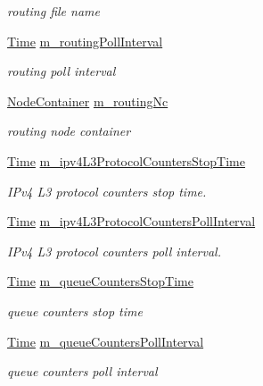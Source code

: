 \begin{DoxyCompactItemize}
\begin{DoxyCompactList}\small\item\em routing file name \end{DoxyCompactList}\item 
\hyperlink{classns3_1_1Time}{Time} \hyperlink{classns3_1_1AnimationInterface_a16bea9b8d92eaa954ea0fc7d067d4ffd}{m\+\_\+routing\+Poll\+Interval}
\begin{DoxyCompactList}\small\item\em routing poll interval \end{DoxyCompactList}\item 
\hyperlink{classns3_1_1NodeContainer}{Node\+Container} \hyperlink{classns3_1_1AnimationInterface_af739aca09318747e578cf97d59efe154}{m\+\_\+routing\+Nc}
\begin{DoxyCompactList}\small\item\em routing node container \end{DoxyCompactList}\item 
\hyperlink{classns3_1_1Time}{Time} \hyperlink{classns3_1_1AnimationInterface_a7927b06bf57543f55408aa0828b9010a}{m\+\_\+ipv4\+L3\+Protocol\+Counters\+Stop\+Time}
\begin{DoxyCompactList}\small\item\em I\+Pv4 L3 protocol counters stop time. \end{DoxyCompactList}\item 
\hyperlink{classns3_1_1Time}{Time} \hyperlink{classns3_1_1AnimationInterface_a7a53cc3f3e1835d7426ed14f3c5c66c5}{m\+\_\+ipv4\+L3\+Protocol\+Counters\+Poll\+Interval}
\begin{DoxyCompactList}\small\item\em I\+Pv4 L3 protocol counters poll interval. \end{DoxyCompactList}\item 
\hyperlink{classns3_1_1Time}{Time} \hyperlink{classns3_1_1AnimationInterface_a7dfb84240a6270b389e3da77e215f503}{m\+\_\+queue\+Counters\+Stop\+Time}
\begin{DoxyCompactList}\small\item\em queue counters stop time \end{DoxyCompactList}\item 
\hyperlink{classns3_1_1Time}{Time} \hyperlink{classns3_1_1AnimationInterface_a677ba5467a03a7df1bfa3c65796d6937}{m\+\_\+queue\+Counters\+Poll\+Interval}
\begin{DoxyCompactList}\small\item\em queue counters poll interval \end{DoxyCompactList}\item 

\end{DoxyCompactItemize}
